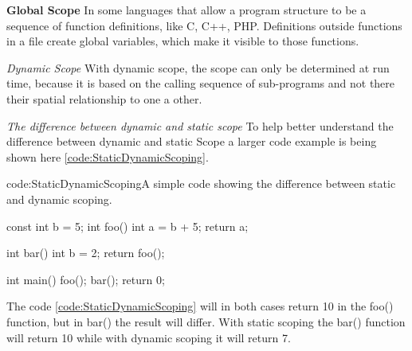 \textbf{Global Scope}
In some languages that allow a program structure to be a sequence of function definitions, like C, C++, PHP. Definitions outside functions in a file create global variables, which make it  visible to those functions.

\textit{Dynamic Scope}
With dynamic scope, the scope can only be determined at run time, because it is based on the calling sequence of sub-programs and not there their spatial relationship to one a other.

\textit{The difference between dynamic and static scope}
To help better understand the difference between dynamic and static Scope a larger code example is being shown here \ref{code:StaticDynamicScoping}.
\begin{code}{code:StaticDynamicScoping}{A simple code showing the difference between static and dynamic scoping.}
\begin{listing}
const int b = 5;
int foo()
{
	int a = b + 5;
	return a;
}

int bar()
{
	int b = 2;
	return foo();
}

int main()
{
	foo();
	bar();
	return 0;
}
\end{listing}
\end{code}
The code \ref{code:StaticDynamicScoping} will in both cases return 10 in the foo() function, but in bar() the result will differ. With static scoping the bar() function will return 10 while with dynamic scoping it will return 7.













